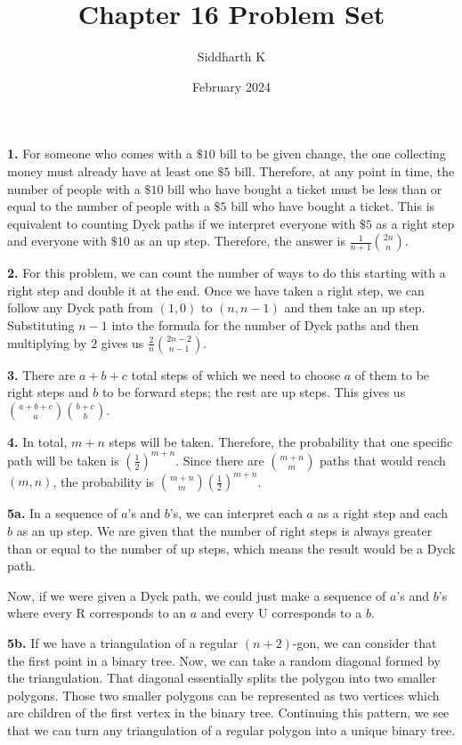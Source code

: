 \documentclass{article}
\title{Chapter 16 Problem Set}
\author{Siddharth K}
\date{February 2024}
\begin{document}
\maketitle

\textbf{1.} For someone who comes with a $\$10$ bill to be given change, the one collecting money must already have at least one $\$5$ bill. Therefore, at any point in time, the number of people with a $\$10$ bill who have bought a ticket must be less than or equal to the number of people with a $\$5$ bill who have bought a ticket. This is equivalent to counting Dyck paths if we interpret everyone with $\$5$ as a right step and everyone with $\$10$ as an up step. Therefore, the answer is $\frac{1}{n + 1}{{2n}\choose n}$.
\newline

\textbf{2.} For this problem, we can count the number of ways to do this starting with a right step and double it at the end. Once we have taken a right step, we can follow any Dyck path from $(1, 0)$ to $(n, n - 1)$ and then take an up step. Substituting $n - 1$ into the formula for the number of Dyck paths and then multiplying by $2$ gives us $\frac{2}{n}{{2n - 2}\choose {n - 1}}$.
\newline

\textbf{3.} There are $a + b + c$ total steps of which we need to choose $a$ of them to be right steps and $b$ to be forward steps; the rest are up steps. This gives us ${{a + b + c}\choose a}{{b + c}\choose b}$.
\newline

\textbf{4.} In total, $m + n$ steps will be taken. Therefore, the probability that one specific path will be taken is $\left(\frac{1}{2}\right)^{m + n}$. Since there are ${m + n}\choose m$ paths that would reach $(m, n)$, the probability is ${{m + n}\choose m}\left(\frac{1}{2}\right)^{m + n}$.
\newline

\textbf{5a.} In a sequence of $a$'s and $b$'s, we can interpret each $a$ as a right step and each $b$ as an up step. We are given that the number of right steps is always greater than or equal to the number of up steps, which means the result would be a Dyck path.
\newline

Now, if we were given a Dyck path, we could just make a sequence of $a$'s and $b$'s where every R corresponds to an $a$ and every U corresponds to a $b$.
\newline

\textbf{5b.} If we have a triangulation of a regular $(n + 2)$-gon, we can consider that the first point in a binary tree. Now, we can take a random diagonal formed by the triangulation. That diagonal essentially splits the polygon into two smaller polygons. Those two smaller polygons can be represented as two vertices which are children of the first vertex in the binary tree. Continuing this pattern, we see that we can turn any triangulation of a regular polygon into a unique binary tree.
\newline
\end{document}
